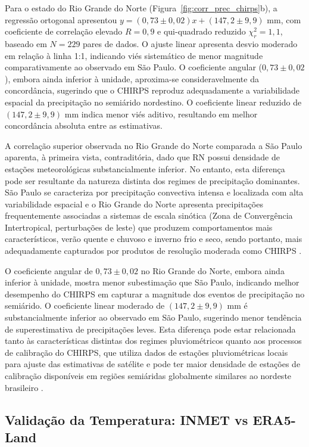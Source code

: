 Para o estado do Rio Grande do Norte (Figura~\ref{fig:corr_prec_chirps}b), a regressão ortogonal apresentou $y = (0{,}73 \pm 0{,}02)x + (147,2 \pm 9,9)$ mm, com coeficiente de correlação elevado $R = 0{,}9$ e qui-quadrado reduzido $\chi^2_r = 1{,}1$, baseado em $N = 229$ pares de dados. O ajuste linear apresenta desvio moderado em relação à linha 1:1, indicando viés sistemático de menor magnitude comparativamente ao observado em São Paulo. O coeficiente angular ($0{,}73 \pm 0{,}02$), embora ainda inferior à unidade, aproxima-se consideravelmente da concordância, sugerindo que o CHIRPS reproduz adequadamente a variabilidade espacial da precipitação no semiárido nordestino. O coeficiente linear reduzido de $(147,2 \pm 9,9)$ mm indica menor viés aditivo, 
resultando em melhor concordância absoluta entre as estimativas.

A correlação superior observada no Rio Grande do Norte comparada a São Paulo aparenta, à primeira vista, contraditória, dado que RN possui densidade de estações meteorológicas substancialmente inferior. No entanto, esta diferença pode ser resultante da natureza distinta dos regimes de precipitação dominantes. São Paulo se caracteriza por precipitação convectiva intensa e localizada com alta variabilidade espacial e o Rio Grande do Norte apresenta precipitações frequentemente associadas a sistemas de escala sinótica (Zona de Convergência Intertropical, perturbações de leste) que produzem comportamentos mais  característicos, verão quente e chuvoso e inverno frio e seco, sendo portanto, mais adequadamente capturados por produtos de resolução moderada como CHIRPS \citep{kousky1980diurnal}.

O coeficiente angular de $0{,}73 \pm 0{,}02$ no Rio Grande do Norte, embora ainda inferior à unidade, mostra menor subestimação que São Paulo, indicando melhor desempenho do CHIRPS em capturar a magnitude dos eventos de precipitação no semiárido. O coeficiente linear moderado de $(147,2 \pm 9,9)$ mm é substancialmente inferior ao observado em São Paulo, sugerindo menor tendência de superestimativa de precipitações leves. Esta diferença pode estar relacionada tanto às características distintas dos regimes pluviométricos quanto aos processos de calibração do CHIRPS, que utiliza dados de estações pluviométricas locais para ajuste das estimativas de satélite e pode ter maior densidade de estações de calibração disponíveis em regiões semiáridas globalmente similares ao nordeste brasileiro \citep{funk2015}.

\subsection{Validação da Temperatura: INMET vs ERA5-Land}

